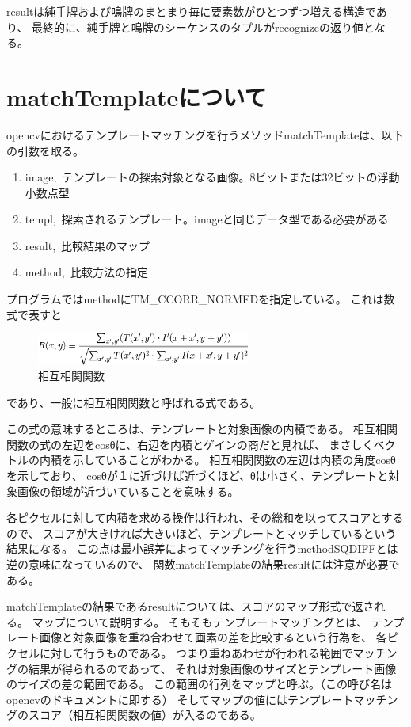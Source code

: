 \documentclass{jsarticle}
\begin{document}
\begin{multicols}{2}
resultは純手牌および鳴牌のまとまり毎に要素数がひとつずつ増える構造であり、
最終的に、純手牌と鳴牌のシーケンスのタプルがrecognizeの返り値となる。

\section{matchTemplateについて}

opencvにおけるテンプレートマッチングを行うメソッドmatchTemplateは、以下の引数を取る。
\begin{enumerate}
\item image,\ テンプレートの探索対象となる画像。8ビットまたは32ビットの浮動小数点型
\item templ,\ 探索されるテンプレート。imageと同じデータ型である必要がある
\item result,\ 比較結果のマップ
\item method,\ 比較方法の指定
\end{enumerate}

プログラムではmethodにTM\_CCORR\_NORMEDを指定している。
これは数式で表すと
\begin{figure}[H]
  \begin{center}
    \includegraphics[clip,width=7.0cm]{./img/ccorr.png}
    \caption{相互相関関数}
    \label{fig:ccorr}
  \end{center}
\end{figure}
であり、一般に相互相関関数と呼ばれる式である。

この式の意味するところは、テンプレートと対象画像の内積である。
相互相関関数の式の左辺をcosθに、右辺を内積とゲインの商だと見れば、
まさしくベクトルの内積を示していることがわかる。
相互相関関数の左辺は内積の角度cosθを示しており、
cosθが１に近づけば近づくほど、θは小さく、テンプレートと対象画像の領域が近づいていることを意味する。

各ピクセルに対して内積を求める操作は行われ、その総和を以ってスコアとするので、
スコアが大きければ大きいほど、テンプレートとマッチしているという結果になる。
この点は最小誤差によってマッチングを行うmethodSQDIFFとは逆の意味になっているので、
関数matchTemplateの結果resultには注意が必要である。

matchTemplateの結果であるresultについては、スコアのマップ形式で返される。
マップについて説明する。
そもそもテンプレートマッチングとは、
テンプレート画像と対象画像を重ね合わせて画素の差を比較するという行為を、
各ピクセルに対して行うものである。
つまり重ねあわせが行われる範囲でマッチングの結果が得られるのであって、
それは対象画像のサイズとテンプレート画像のサイズの差の範囲である。
この範囲の行列をマップと呼ぶ。（この呼び名はopencvのドキュメント\cite{matchTemplateC}\cite{matchTemplatePy}に即する）
そしてマップの値にはテンプレートマッチングのスコア（相互相関関数の値）が入るのである。


\end{multicols}
\end{document}
